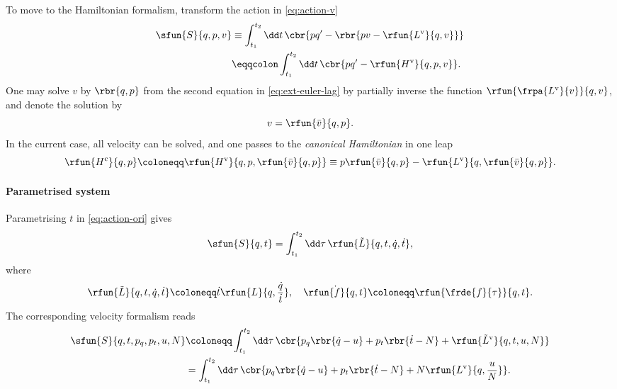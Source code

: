 \documentclass[a4paper]{article}
\begin{document}
To move to the Hamiltonian formalism, transform the action in 
\cref{eq:action-v}
\begin{align}
\sfun{S}{q, p, v} &\equiv \int_{t_1}^{t_2}\dd t\,\cbr{pq' - 
\rbr{pv-\rfun{L^\text{v}}{q, v}}} \nonumber \\
&\eqqcolon \int_{t_1}^{t_2}\dd t\,\cbr{pq' - \rfun{H^\text{v}}{q, p, v}}.
\end{align}
One may solve $v$ by $\rbr{q, p}$ from the second equation in 
\cref{eq:ext-euler-lag} by partially inverse the function 
$\rfun{\frpa{L^\text{v}}{v}}{q, v}$, and denote the solution by
\begin{equation}
v = \rfun{\bar v}{q, p}.
\label{eq:v-bar-v}
\end{equation}
In the current case, all velocity can be solved, and one passes to the 
\emph{canonical Hamiltonian} in one leap
\begin{equation}
\rfun{H^\text{c}}{q, p} \coloneqq %
\rfun{H^\text{v}}{q, p, \rfun{\bar v}{q, p}} \equiv
p\rfun{\bar v}{q, p} - \rfun{L^\text{v}}{q, \rfun{\bar v}{q, p}}.
\label{eq:H^c}
\end{equation}

\paragraph{Parametrised system}

Parametrising $t$ in \cref{eq:action-ori} gives
\begin{equation}
\sfun{S}{q, t} = \int_{t_1}^{t_2} \dd \tau\,\rfun{\tilde L}{q, t, \dot 
q, \dot t},
\end{equation}
where
\begin{equation}
\rfun{\tilde L}{q, t, \dot q, \dot t} \coloneqq \dot t \rfun{L}{q, 
\frac{\dot q}{\dot t}},\quad
\dot \rfun{f}{q,t} \coloneqq \rfun{\frde{f}{\tau}}{q,t}.
\end{equation}
The corresponding velocity formalism reads
\begin{align}
\sfun{S}{q, t, p_q, p_t, u, N} &\coloneqq \int_{t_1}^{t_2}\dd \tau\,
\cbr{p_q\rbr{\dot q-u}+p_t\rbr{\dot t-N} +
\rfun{\tilde L^\text{v}}{q, t, u, N}} \nonumber \\
&=\int_{t_1}^{t_2}\dd \tau\,
\cbr{p_q\rbr{\dot q-u}+p_t\rbr{\dot t-N} +
N \rfun{L^\text{v}}{q, \frac{u}{N}}}.
\label{eq:action-Nu}
\end{align}
\end{document}
